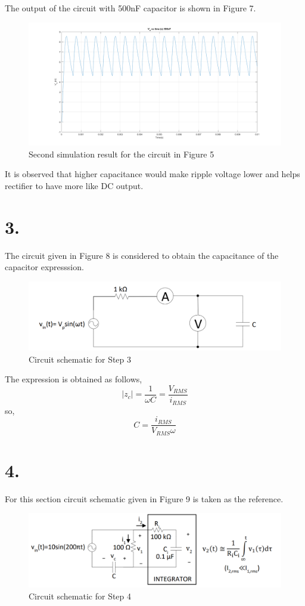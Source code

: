 \documentclass[letterpaper,12pt]{article}
\begin{document}
The output of the circuit  with 500nF capacitor is shown in Figure   7.
\begin{figure}[H]
	\centering
   \includegraphics[width=1\textwidth]{PRE_2b_500nF.png}
   \caption{Second simulation result for the circuit in Figure 5}
\end{figure} 
It is observed that higher capacitance would make ripple voltage lower and helps rectifier to have more like DC output.
\section{3.}
The circuit given in Figure 8 is considered to obtain the capacitance of the capacitor expresssion.
\begin{figure}[H]
	\centering
   \includegraphics[width=1\textwidth]{PRE3.png}
   \caption{Circuit schematic for Step 3}
\end{figure} 
The expression is obtained as follows,
\[|z_c| = \frac{1}{\omega C} = \frac{V_{RMS}}{i_{RMS}}\]
so,
\[C = \frac{i_{RMS}}{V_{RMS} \omega}
	\]


\section{4.}
For this section circuit schematic given in Figure 9 is taken as the reference.
\begin{figure}[H]
	\centering
   \includegraphics[width=1\textwidth]{PRE4.png}
   \caption{Circuit schematic for Step 4}
\end{figure} 
\end{document}
